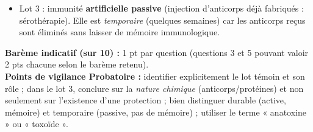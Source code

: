 \documentclass[11pt]{article}
\newcommand{\cle}[1]{{\popxbold\color{popdark}#1}}
\begin{document}
\begin{corrige}
\begin{enumerate}
\begin{itemize}
\item Lot 3 : immunité \textbf{artificielle passive} (injection d'anticorps déjà fabriqués : \cle{sérothérapie}). Elle est \emph{temporaire} (quelques semaines) car les anticorps reçus sont éliminés sans laisser de mémoire immunologique.
\end{itemize}
\end{enumerate}
\textbf{Barème indicatif (sur 10) :} 1 pt par question (questions 3 et 5 pouvant valoir 2 pts chacune selon le barème retenu).\\
\textbf{Points de vigilance Probatoire :} identifier explicitement le lot témoin et son rôle ; dans le lot 3, conclure sur la \emph{nature chimique} (anticorps/protéines) et non seulement sur l'existence d'une protection ; bien distinguer durable (active, mémoire) et temporaire (passive, pas de mémoire) ; utiliser le terme « anatoxine » ou « toxoïde ».
\end{corrige}
\end{document}
